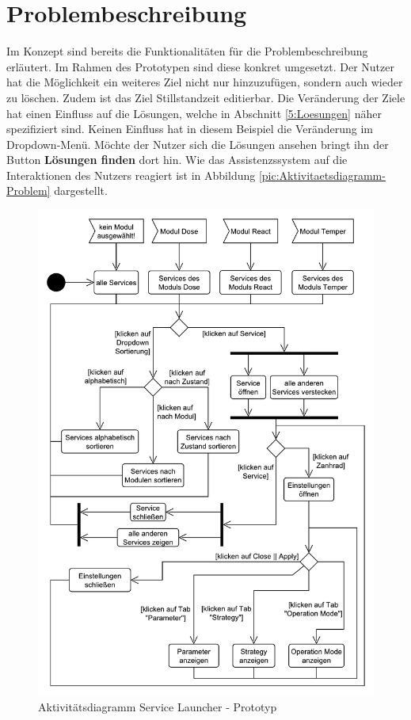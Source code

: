\section{Problembeschreibung}
\label{5:Problembeschreibung}
Im Konzept sind bereits die Funktionalitäten für die Problembeschreibung erläutert. Im Rahmen des Prototypen sind diese konkret umgesetzt. Der Nutzer hat die Möglichkeit ein weiteres Ziel nicht nur hinzuzufügen, sondern auch wieder zu löschen. Zudem ist das Ziel Stillstandzeit editierbar. Die Veränderung der Ziele hat einen Einfluss auf die Lösungen, welche in Abschnitt \ref{5:Loesungen} näher spezifiziert sind. Keinen Einfluss hat in diesem Beispiel die Veränderung im Dropdown-Menü. Möchte der Nutzer sich die Lösungen ansehen bringt ihn der Button \textbf{Lösungen finden} dort hin. Wie das Assistenzssystem auf die Interaktionen des Nutzers reagiert ist in Abbildung \ref{pic:Aktivitaetsdiagramm-Problem} dargestellt.

\begin{figure}[htbp]
\centering
\includegraphics[scale=0.65]{DA_files/UML/Prototyp/Aktivitaetsdiagramm-ServiceLauchner.pdf}
\caption{Aktivitätsdiagramm Service Launcher - Prototyp}
\label{pic:Aktivitaetsdiagramm-ServiceLauncher}
\end{figure}

